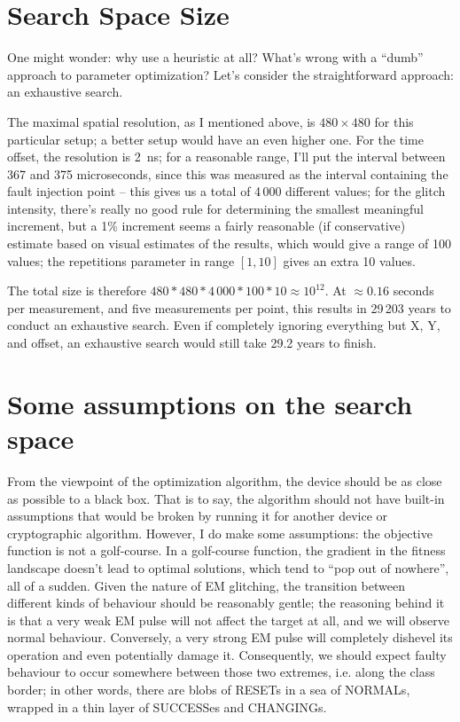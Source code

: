 \documentclass[times, utf8, diplomski]{fer}
\begin{document}
\section{Search Space Size}\label{sec:search_space}
One might wonder: why use a heuristic at all? What's wrong with a ``dumb''
approach to parameter optimization? Let's consider the straightforward
approach: an exhaustive search.

The maximal spatial resolution, as I mentioned above, is $480 \times 480$ for
this particular setup; a better setup would have an even higher one. For the
time offset, the resolution is \SI{2}{\nano\second}; for a reasonable range,
I'll put the interval between 367 and 375 microseconds, since this was measured
as the interval containing the fault injection point -- this gives us a total of
4\,000 different values; for the glitch intensity, there's really no good rule
for determining the smallest meaningful increment, but a 1\% increment seems
a fairly reasonable (if conservative) estimate based on visual estimates of
the results, which would give a range of 100 values; the repetitions parameter
in range $[1,10]$ gives an extra 10 values.

The total size is therefore $480*480*4\,000*100*10\approx 10^{12}$.
At $\approx0.16$ seconds per measurement, and five measurements per point, this
results in 29\,203 years to conduct an exhaustive search. Even if completely
ignoring everything but X, Y, and offset, an exhaustive search would still
take 29.2 years to finish.



\section{Some assumptions on the search space}\label{sec:assumptions}
From the viewpoint of the optimization algorithm, the device should be as close
as possible to a black box. That is to say, the algorithm should not have built-in
assumptions that would be broken by running it for another device or cryptographic
algorithm. However, I do make some assumptions:
the objective function is not a golf-course. In a golf-course function, the
gradient in the fitness landscape doesn't lead to optimal solutions, which tend
to ``pop out of nowhere'', all of a sudden. Given the nature of EM glitching, the
transition between different kinds of behaviour should be reasonably gentle; the
reasoning behind it is that a very weak EM pulse will not affect the target at all,
and we will observe normal behaviour. Conversely, a very strong EM pulse will
completely dishevel its operation and even potentially damage it. Consequently,
we should expect faulty behaviour to occur somewhere between those two extremes,
i.e. along the class border; in other words, there are blobs of RESETs in a sea
of NORMALs, wrapped in a thin layer of SUCCESSes and CHANGINGs.
\end{document}
